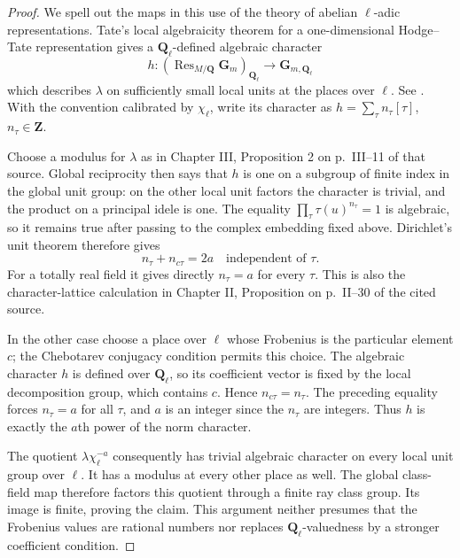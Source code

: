 \documentclass[11pt,oneside]{article}
\begin{document}
\begin{proof}
We spell out the maps in this use of the theory of
abelian $\ell$-adic representations. Tate's local
algebraicity theorem for a one-dimensional Hodge--Tate
representation gives a $\mathbf Q_\ell$-defined
algebraic character
\[
 h:(\operatorname{Res}_{M/\mathbf Q}\mathbf G_m)_{\mathbf Q_\ell}
                              \longrightarrow\mathbf G_{m,\mathbf Q_\ell}
\]
which describes $\lambda$ on sufficiently small
local units at the places over $\ell$. See
\cite[Chapter III, Theorem on p.~III--7 and Proposition
on p.~III--9]{A_SerreAbelian}. With the convention
calibrated by $\chi_\ell$, write its character as
$h=\sum_\tau n_\tau[\tau]$, $n_\tau\in\mathbf Z$.

Choose a modulus for $\lambda$ as in Chapter III,
Proposition 2 on p.~III--11 of that source. Global
reciprocity then says that $h$ is one on a subgroup
of finite index in the global unit group: on the
other local unit factors the character is trivial,
and the product on a principal idele is one. The
equality $\prod_\tau\tau(u)^{n_\tau}=1$ is algebraic,
so it remains true after passing to the complex
embedding fixed above. Dirichlet's unit theorem
therefore gives
\[
                  n_\tau+n_{c\tau}=2a
                  \quad\text{independent of }\tau.
\]
For a totally real field it gives directly
$n_\tau=a$ for every $\tau$. This is also the
character-lattice calculation in Chapter II,
Proposition on p.~II--30 of the cited source.

In the other case choose a place over $\ell$ whose
Frobenius is the particular element $c$; the
Chebotarev conjugacy condition permits this choice.
The algebraic character $h$ is defined over
$\mathbf Q_\ell$, so its coefficient vector is fixed
by the local decomposition group, which contains
$c$. Hence $n_{c\tau}=n_\tau$. The preceding equality
forces $n_\tau=a$ for all $\tau$, and $a$ is an
integer since the $n_\tau$ are integers. Thus $h$
is exactly the $a$th power of the norm character.

The quotient $\lambda\chi_\ell^{-a}$ consequently
has trivial algebraic character on every local
unit group over $\ell$. It has a modulus at every
other place as well. The global class-field map
therefore factors this quotient through a finite
ray class group. Its image is finite, proving the
claim. This argument neither presumes that the
Frobenius values are rational numbers nor replaces
$\mathbf Q_\ell$-valuedness by a stronger coefficient
condition.
\end{proof}
\end{document}
